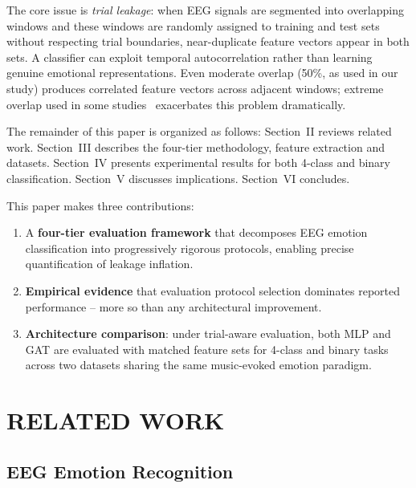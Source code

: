 \documentclass[a4paper, 10pt, conference]{ieeeconf}
\begin{document}
The core issue is \emph{trial leakage}: when EEG signals are segmented into overlapping windows and these windows are randomly assigned to training and test sets without respecting trial boundaries, near-duplicate feature vectors appear in both sets. A classifier can exploit temporal autocorrelation rather than learning genuine emotional representations. Even moderate overlap (50\%, as used in our study) produces correlated feature vectors across adjacent windows; extreme overlap used in some studies~\cite{craik2019} exacerbates this problem dramatically.

The remainder of this paper is organized as follows: Section~II reviews related work. Section~III describes the four-tier methodology, feature extraction and datasets. Section~IV presents experimental results for both 4-class and binary classification. Section~V discusses implications. Section~VI concludes.

This paper makes three contributions:
\begin{enumerate}
    \item A \textbf{four-tier evaluation framework} that decomposes EEG emotion classification into progressively rigorous protocols, enabling precise quantification of leakage inflation.
    \item \textbf{Empirical evidence} that evaluation protocol selection dominates reported performance -- more so than any architectural improvement.
    \item \textbf{Architecture comparison}: under trial-aware evaluation, both MLP and GAT are evaluated with matched feature sets for 4-class and binary tasks across two datasets sharing the same music-evoked emotion paradigm.
\end{enumerate}

\section{RELATED WORK}

\subsection{EEG Emotion Recognition}
\end{document}
